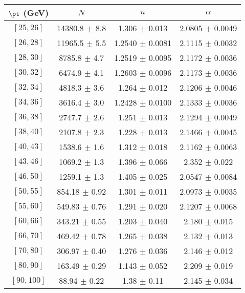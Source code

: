 \begin{tabular}{c||c|c|c}
$\pt$ (GeV) & $N$ & $n$ & $\alpha$ \\
\hline
$[25, 26]$ & 14380.8 $\pm$ 8.8 & 1.306 $\pm$ 0.013 & 2.0805 $\pm$ 0.0049\\
$[26, 28]$ & 11965.5 $\pm$ 5.5 & 1.2540 $\pm$ 0.0081 & 2.1115 $\pm$ 0.0032\\
$[28, 30]$ & 8785.8 $\pm$ 4.7 & 1.2519 $\pm$ 0.0095 & 2.1172 $\pm$ 0.0036\\
$[30, 32]$ & 6474.9 $\pm$ 4.1 & 1.2603 $\pm$ 0.0096 & 2.1173 $\pm$ 0.0036\\
$[32, 34]$ & 4818.3 $\pm$ 3.6 & 1.264 $\pm$ 0.012 & 2.1206 $\pm$ 0.0046\\
$[34, 36]$ & 3616.4 $\pm$ 3.0 & 1.2428 $\pm$ 0.0100 & 2.1333 $\pm$ 0.0036\\
$[36, 38]$ & 2747.7 $\pm$ 2.6 & 1.251 $\pm$ 0.013 & 2.1294 $\pm$ 0.0049\\
$[38, 40]$ & 2107.8 $\pm$ 2.3 & 1.228 $\pm$ 0.013 & 2.1466 $\pm$ 0.0045\\
$[40, 43]$ & 1538.6 $\pm$ 1.6 & 1.312 $\pm$ 0.018 & 2.1162 $\pm$ 0.0063\\
$[43, 46]$ & 1069.2 $\pm$ 1.3 & 1.396 $\pm$ 0.066 & 2.352 $\pm$ 0.022\\
$[46, 50]$ & 1259.1 $\pm$ 1.3 & 1.405 $\pm$ 0.025 & 2.0547 $\pm$ 0.0084\\
$[50, 55]$ & 854.18 $\pm$ 0.92 & 1.301 $\pm$ 0.011 & 2.0973 $\pm$ 0.0035\\
$[55, 60]$ & 549.83 $\pm$ 0.76 & 1.291 $\pm$ 0.020 & 2.1207 $\pm$ 0.0068\\
$[60, 66]$ & 343.21 $\pm$ 0.55 & 1.203 $\pm$ 0.040 & 2.180 $\pm$ 0.015\\
$[66, 70]$ & 469.42 $\pm$ 0.78 & 1.265 $\pm$ 0.038 & 2.132 $\pm$ 0.013\\
$[70, 80]$ & 306.97 $\pm$ 0.40 & 1.276 $\pm$ 0.036 & 2.146 $\pm$ 0.012\\
$[80, 90]$ & 163.49 $\pm$ 0.29 & 1.143 $\pm$ 0.052 & 2.209 $\pm$ 0.019\\
$[90, 100]$ & 88.94 $\pm$ 0.22 & 1.38 $\pm$ 0.11 & 2.145 $\pm$ 0.034\\
\end{tabular}
